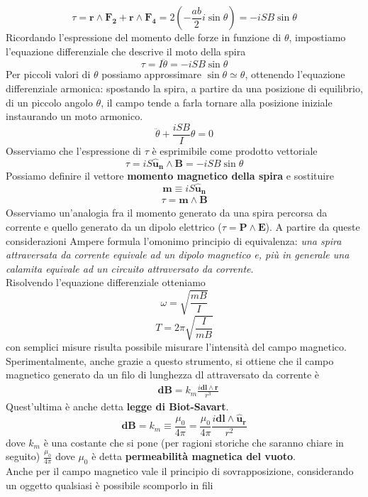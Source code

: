 \documentclass[
10pt, %
a4paper, %
oneside, %
headinclude,footinclude, %
BCOR5mm, %
]{scrartcl}
\begin{document}
\[\tau= \mathbf{r}\wedge\mathbf{F_2}+\mathbf{r}\wedge\mathbf{F_4}=2(-\frac{ab}{2}i\sin\theta)= -i SB \sin\theta\]
Ricordando l'espressione del momento delle forze in funzione di $\theta$, impostiamo l'equazione differenziale che descrive il moto della spira
\[\tau=I\ddot{\theta}=- iSB\sin\theta\]
Per piccoli valori di $\theta$ possiamo approssimare $\sin\theta \simeq \theta$, ottenendo l'equazione differenziale armonica: spostando la spira, a partire da una posizione di equilibrio, di un piccolo angolo $\theta$, il campo tende a farla tornare alla posizione iniziale instaurando un moto armonico. 
\[\ddot{\theta}+ \frac{iSB}{I}\theta= 0 \]
Osserviamo che l'espressione di $\tau$ è esprimibile come prodotto vettoriale
\[\tau=iS\mathbf{\hat{u}_n}\wedge\mathbf{B}=-iSB\sin\theta\]
Possiamo definire il vettore \textbf{momento magnetico della spira} e sostituire
\[\mathbf{m}\equiv iS\mathbf{\hat{u}_n}\] 
\begin{align}\label{eq:momento_spira}
	\tau=\mathbf{m}\wedge\mathbf{B}
\end{align}
Osserviamo un'analogia fra il momento generato da una spira percorsa da corrente e quello generato da un dipolo elettrico ($\tau=\mathbf{P}\wedge\mathbf{E}$). A partire da queste considerazioni Ampere formula l'omonimo principio di equivalenza: \textit{una spira attraversata da corrente equivale ad un dipolo magnetico e, più in generale una calamita equivale ad un circuito attraversato da corrente}.\\
Risolvendo l'equazione differenziale otteniamo
\[\omega=\sqrt{\frac{mB}{I}}\]
\[T=2\pi\sqrt{\frac{I}{mB}}\]
con semplici misure risulta possibile misurare l'intensità del campo magnetico.\\
Sperimentalmente, anche grazie a questo strumento, si ottiene che il campo magnetico generato da un filo di lunghezza dl attraversato da corrente è
\begin{align}\label{eq:campo_magnetico_filo_infinitesimo}
&\mathbf{dB}=k_m\frac{i\mathbf{dl}\wedge\mathbf{r}}{r^3}
\end{align}
Quest'ultima è anche detta \textbf{legge di Biot-Savart}.\\
\[\mathbf{dB}=k_m \equiv\frac{\mu_0}{4\pi}=\frac{\mu_0}{4\pi}\frac{i\mathbf{dl}\wedge\mathbf{\hat{u}_r}}{r^2}\]
dove \(k_m\) è una costante che si pone (per ragioni storiche che saranno chiare in seguito) \(\frac{\mu_0}{4\pi}\) dove $\mu_0$ è detta \textbf{permeabilità magnetica del vuoto}.\\
Anche per il campo magnetico vale il principio di sovrapposizione, considerando un oggetto qualsiasi è possibile scomporlo in fili
\end{document}

